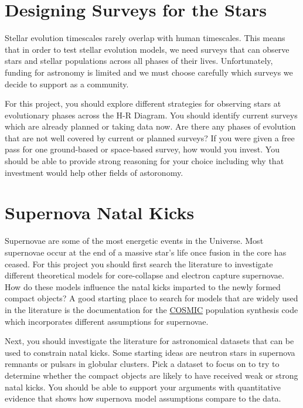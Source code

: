 \documentclass[10pt]{extarticle}
\begin{document}
\section{Designing Surveys for the Stars}
Stellar evolution timescales rarely overlap with human timescales. This means
that in order to test stellar evolution models, we need surveys that can observe
stars and stellar populations across all phases of their lives. Unfortunately,
funding for astronomy is limited and we must choose carefully which surveys we
decide to support as a community.  

For this project, you should explore different strategies for observing stars at
evolutionary phases across the H-R Diagram. You should identify current surveys
which are already planned or taking data now. Are there any phases of evolution
that are not well covered by current or planned surveys? If you were given a
free pass for one ground-based or space-based survey, how would you invest. You
should be able to provide strong reasoning for your choice including why that
investment would help other fields of astoronomy. 


\section{Supernova Natal Kicks}
Supernovae are some of the most energetic events in the Universe. Most
supernovae occur at the end of a massive star's life once fusion in the core has
ceased. For this project you should first search the literature to investigate
different theoretical models for core-collapse and electron capture supernovae.
How do these models influence the natal kicks imparted to the newly formed
compact objects? A good starting place to search for models that are widely used
in the literature is the documentation for the
\href{https://cosmic-popsynth.github.io/}{COSMIC} population synthesis code
which incorporates different assumptions for supernovae. 

Next, you should investigate the literature for astronomical datasets that can
be used to constrain natal kicks. Some starting ideas are neutron stars in
supernova remnants or pulsars in globular clusters. Pick a dataset to focus on
to try to determine whether the compact objects are likely to have received weak
or strong natal kicks. You should be able to support your arguments with
quantitative evidence that shows how supernova model assumptions compare to the
data. 
\end{document}
